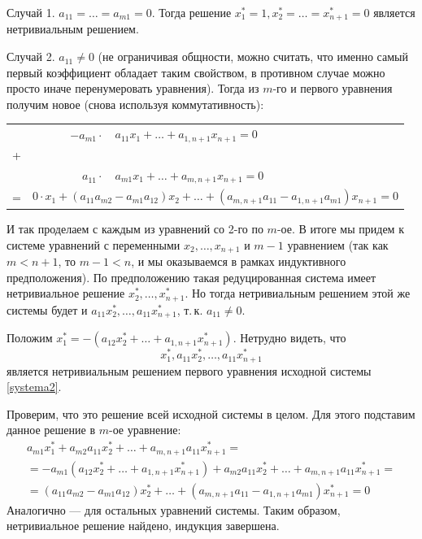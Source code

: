 \begin{enumerate}
Случай 1. $a_{11}=\dots=a_{m1}=0$. Тогда решение $x_1^*=1, x_2^*=\dots=x_{n+1}^*=0$ является нетривиальным решением.

Случай 2. $a_{11}\ne 0$ (не ограничивая общности, можно считать, что именно самый первый коэффициент обладает таким свойством, в противном случае можно просто иначе перенумеровать уравнения). Тогда из $m$-го и первого уравнения получим новое (снова используя коммутативность):
\begin{center}
\begin{tabular}{rr|l}
& $-a_{m1}\cdot$  & $a_{11}x_1+\dots+a_{1,n+1}x_{n+1}=0$ \\[-5pt]
+ & & \\[-5pt]
& $a_{11}\cdot$ & $a_{m1}x_1+\dots+a_{m,n+1}x_{n+1}=0$\\ \hline
= & \multicolumn{2}{l}{$0\cdot x_1+(a_{11}a_{m2}-a_{m1}a_{12})x_2+\dots+(a_{m,n+1}a_{11}-a_{1,n+1}a_{m1})x_{n+1}=0$}
\end{tabular}
\end{center}
И так проделаем с каждым из уравнений со 2-го по $m$-ое. В итоге мы придем к системе уравнений с переменными $x_2,\dots,x_{n+1}$ и $m-1$ уравнением (так как $m<n+1$, то $m-1<n$, и мы оказываемся в рамках индуктивного предположения). По предположению такая редуцированная система имеет нетривиальное решение $x_2^*,\dots,x_{n+1}^*$. Но тогда нетривиальным решением этой же системы будет и $a_{11}x_2^*,\dots,a_{11}x_{n+1}^*$, т.\,к. $a_{11}\ne 0$.

Положим $x_1^*=-(a_{12}x_2^*+\dots+a_{1,n+1}x_{n+1}^*)$. Нетрудно видеть, что 
$$
x_1^*,a_{11}x_2^*,\dots,a_{11}x_{n+1}^*
$$ является нетривиальным решением первого уравнения исходной системы \eqref{systema2}.

Проверим, что это решение всей исходной системы в целом. Для этого подставим данное решение в $m$-ое уравнение:
\begin{gather*}
a_{m1}x_1^*+a_{m2}a_{11}x_2^*+\dots+a_{m,n+1}a_{11}x_{n+1}^*=\\
=-a_{m1}(a_{12}x_2^*+\dots+a_{1,n+1}x_{n+1}^*)+a_{m2}a_{11}x_2^*+\dots+a_{m,n+1}a_{11}x_{n+1}^*=\\
=(a_{11}a_{m2}-a_{m1}a_{12})x_2^*+\dots+(a_{m,n+1}a_{11}-a_{1,n+1}a_{m1})x_{n+1}^*=0
\end{gather*}
Аналогично --- для остальных уравнений системы. Таким образом, нетривиальное решение найдено, индукция завершена.
\epf


\end{enumerate}
